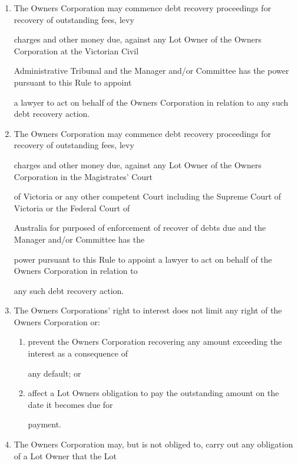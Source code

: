 \documentclass{article}
\begin{document}
\begin{enumerate}[label=\arabic*.]
\begin{enumerate}[label=\arabic{enumi}.\arabic*.]
\begin{enumerate}[label=(\arabic*)]
\item {\fontsize{9.962}{1} The Owners Corporation may commence debt recovery proceedings for recovery of outstanding fees, levy }

{\fontsize{10.02}{1}charges and other money due, against any Lot Owner of the Owners Corporation at the Victorian Civil }

{\fontsize{10.02}{1}Administrative Tribunal and the Manager and/or Committee has the power pursuant to this Rule to appoint }

{\fontsize{10.02}{1}a lawyer to act on behalf of the Owners Corporation in relation to any such debt recovery action. }

\item {\fontsize{9.962}{1} The Owners Corporation may commence debt recovery proceedings for recovery of outstanding fees, levy }

{\fontsize{10.02}{1}charges and other money due, against any Lot Owner of the Owners Corporation in the Magistrates’ Court }

{\fontsize{10.02}{1}of Victoria or any other competent Court including the Supreme Court of Victoria or the Federal Court of }

{\fontsize{10.02}{1}Australia for purposed of enforcement of recover of debts due and the Manager and/or Committee has the }

{\fontsize{10.02}{1}power pursuant to this Rule to appoint a lawyer to act on behalf of the Owners Corporation in relation to }

{\fontsize{10.02}{1}any such debt recovery action. }

\item {\fontsize{9.962}{1} The Owners Corporations’ right to interest does not limit any right of the Owners Corporation or: }

\begin{enumerate}[label=(\alph*)]
\item {\fontsize{9.962}{1} prevent the Owners Corporation recovering any amount exceeding the interest as a consequence of }

{\fontsize{10.02}{1}any default; or }

\item {\fontsize{9.962}{1} affect a Lot Owners obligation to pay the outstanding amount on the date it becomes due for }

{\fontsize{10.02}{1}payment. }

\end{enumerate}
\item {\fontsize{9.962}{1} The Owners Corporation may, but is not obliged to, carry out any obligation of a Lot Owner that the Lot }


\end{enumerate}
\end{enumerate}
\end{enumerate}
\end{document}
